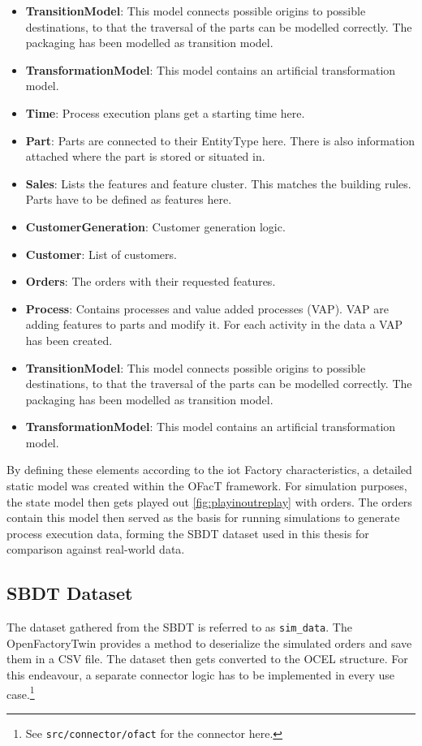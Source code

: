 \begin{itemize}
  \item \textbf{TransitionModel}: This model connects possible origins to possible destinations, to that the traversal of the parts can be modelled correctly. The packaging has been modelled as transition model.
  \item \textbf{TransformationModel}: This model contains an artificial transformation model.
  \item \textbf{Time}: Process execution plans get a starting time here.
  \item \textbf{Part}: Parts are connected to their EntityType here. There is also information attached where the part is stored or situated in.
  \item \textbf{Sales}: Lists the features and feature cluster. This matches the building rules. Parts have to be defined as features here.
  \item \textbf{CustomerGeneration}: Customer generation logic.
  \item \textbf{Customer}: List of customers.
  \item \textbf{Orders}: The orders with their requested features.
  \item \textbf{Process}: Contains processes and value added processes (VAP). VAP are adding features to parts and modify it. For each activity in the data a VAP has been created.
  \item \textbf{TransitionModel}: This model connects possible origins to possible destinations, to that the traversal of the parts can be modelled correctly. The packaging has been modelled as transition model.
  \item \textbf{TransformationModel}: This model contains an artificial transformation model.
\end{itemize}

By defining these elements according to the \gls{iot} Factory characteristics, a detailed static model was created within the OFacT framework. For simulation purposes, the state model then gets played out \autoref{fig:playinoutreplay} with orders. The orders contain this model then served as the basis for running simulations to generate process execution data, forming the SBDT dataset used in this thesis for comparison against real-world data.

\subsection*{SBDT Dataset}

The dataset gathered from the SBDT is referred to as \texttt{sim\_data}. The OpenFactoryTwin provides a method to deserialize the simulated orders and save them in a CSV file. The dataset then gets converted to the OCEL structure. For this endeavour, a separate connector logic has to be implemented in every use case.\footnote{See \texttt{src/connector/ofact} for the connector here.}


